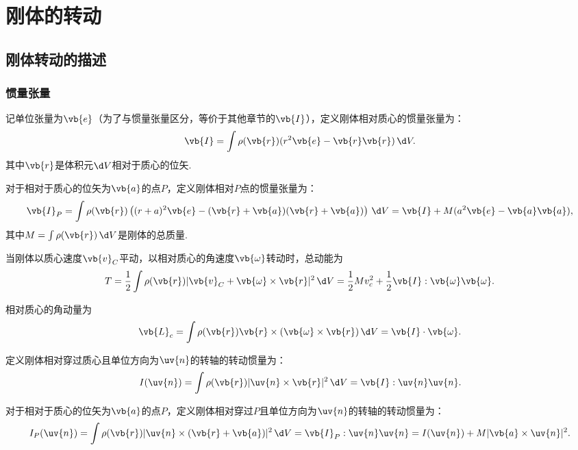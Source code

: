 \section{刚体的转动}
\subsection{刚体转动的描述}
\subsubsection{惯量张量}
记单位张量为\(\vb{e}\)（为了与惯量张量区分，等价于其他章节的\(\vb{I}\)），定义刚体相对质心的惯量张量为：
\begin{equation*}
	\vb{I} = \int \rho(\vb{r}) (r^2 \vb{e} - \vb{r} \vb{r}) \, \d V.
\end{equation*}
其中\(\vb{r}\)是体积元\(\d V\)相对于质心的位矢.

对于相对于质心的位矢为\(\vb{a}\)的点\(P\)，定义刚体相对\(P\)点的惯量张量为：
\begin{equation*}
	\vb{I}_P = \int \rho(\vb{r}) \left((r + a)^2 \vb{e} - (\vb{r} + \vb{a})(\vb{r} + \vb{a})\right) \, \d V = \vb{I} + M (a^2 \vb{e} - \vb{a} \vb{a}),
\end{equation*}
其中\(M = \int \rho(\vb{r}) \, \d V\)是刚体的总质量.

当刚体以质心速度\(\vb{v}_C\)平动，以相对质心的角速度\(\vb{\omega}\)转动时，总动能为
\begin{equation*}
	T = \frac{1}{2} \int \rho(\vb{r}) |\vb{v}_C + \vb{\omega} \times \vb{r}|^2 \, \d V = \frac{1}{2} M v_c^2 + \frac{1}{2} \vb{I} : \vb{\omega} \vb{\omega}.
\end{equation*}

相对质心的角动量为
\begin{equation*}
	\vb{L}_c = \int \rho(\vb{r}) \vb{r} \times (\vb{\omega} \times \vb{r}) \, \d V = \vb{I} \cdot \vb{\omega}.
\end{equation*}

定义刚体相对穿过质心且单位方向为\(\uv{n}\)的转轴的转动惯量为：
\begin{equation*}
	I(\uv{n}) = \int \rho(\vb{r}) |\uv{n} \times \vb{r}|^2 \, \d V = \vb{I} : \uv{n} \uv{n}.
\end{equation*}

对于相对于质心的位矢为\(\vb{a}\)的点\(P\)，定义刚体相对穿过\(P\)且单位方向为\(\uv{n}\)的转轴的转动惯量为：
\begin{equation*}
	I_P(\uv{n}) = \int \rho(\vb{r}) |\uv{n} \times (\vb{r} + \vb{a})|^2 \, \d V = \vb{I}_P : \uv{n} \uv{n} = I(\uv{n}) + M |\vb{a} \times \uv{n}|^2.
\end{equation*}

